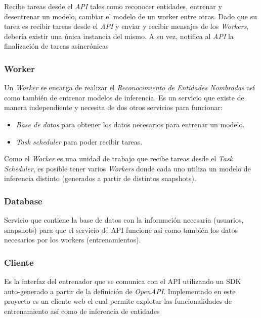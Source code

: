 \documentclass[12pt,a4paper,]{scrartcl}
\providecommand{\tightlist}{%
  \setlength{\itemsep}{0pt}\setlength{\parskip}{0pt}}
\begin{document}
Recibe tareas desde el \emph{API} tales como reconocer entidades, entrenar y desentrenar un modelo, cambiar el modelo de un worker entre otras. Dado que su tarea es recibir tareas desde el \emph{API} y enviar y recibir mensajes de los \emph{Workers}, debería existir una única instancia del mismo.
A su vez, notifica al \emph{API} la finalización de tareas asincrónicas

\hypertarget{worker}{%
\subsubsection{Worker}\label{worker}}

Un \emph{Worker} se encarga de realizar el \emph{Reconocimiento de Entidades Nombradas} así como también de entrenar modelos de inferencia. Es un servicio que existe de manera independiente y necesita de dos otros servicios para funcionar:

\begin{itemize}
\tightlist
\item
  \emph{Base de datos} para obtener los datos necesarios para entrenar un modelo.
\item
  \emph{Task scheduler} para poder recibir tareas.
\end{itemize}

Como el \emph{Worker} es una unidad de trabajo que recibe tareas desde el \emph{Task Scheduler}, es posible tener varios \emph{Workers} donde cada uno utiliza un modelo de inferencia distinto (generados a partir de distintos snapshots).

\hypertarget{database}{%
\subsubsection{Database}\label{database}}

Servicio que contiene la base de datos con la información necesaria (usuarios, snapshots) para que el servicio de API funcione así como también los datos necesarios por los workers (entrenamientos).

\hypertarget{cliente}{%
\subsubsection{Cliente}\label{cliente}}

Es la interfaz del entrenador que se comunica con el API utilizando un SDK auto-generado a partir de la definición de \emph{OpenAPI}. Implementado en este proyecto es un cliente web el cual permite explotar las funcionalidades de entrenamiento así como de inferencia de entidades
\end{document}

